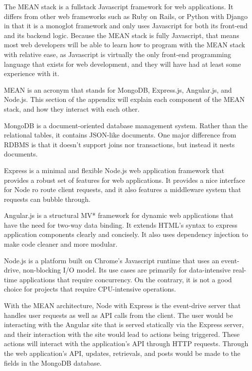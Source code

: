 \documentclass[12pt]{article}
\begin{document}

The MEAN stack is a fullstack Javascript framework for web applications. It differs from other web frameworks such as Ruby on Rails, or Python with Django in that it is a monoglot framework and only uses Javascript for both its front-end and its backend logic. Because the MEAN stack is fully Javascript, that means most web developers will be able to learn how to program with the MEAN stack with relative ease, as Javascript is virtually the only front-end programming language that exists for web development, and they will have had at least some experience with it.

MEAN is an acronym that stands for MongoDB, Express.js, Angular.js, and Node.js. This section of the appendix will explain each component of the MEAN stack, and how they interact with each other.

MongoDB is a document-oriented database management system. Rather than the relational tables, it contains JSON-like documents. One major difference from RDBMS is that it doesn't support joins nor transactions, but instead it nests documents.

Express is a minimal and flexible Node.js web application framework that provides a robust set of features for web applications. It provides a nice interface for Node ro route client requests, and it also features a middleware system that requests can bubble through.

Angular.js is a structural MV* framework for dynamic web applications that have the need for two-way data binding. It extends HTML's syntax to express application components clearly and concisely. It also uses dependency injection to make code cleaner and more modular.

Node.js is a platform built on Chrome's Javascript runtime that uses an event-drive, non-blocking I/O model. Its use cases are primarily for data-intensive real-time applications that require concurrency. On the contrary, it is not a good choice for projects that require CPU-intensive operations.

With the MEAN architecture, Node with Express is the event-drive server that handles user requests as well as API calls from the client. The user would be interacting with the Angular site that is served statically via the Express server, and their interaction with the site would lead to actions being triggered. These actions will interact with the application's API through HTTP requests. Through the web application's API, updates, retrievals, and posts would be made to the fields in the MongoDB database.
\end{document}

